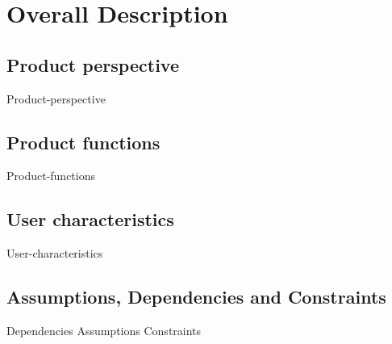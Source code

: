 \section{Overall Description}

\subsection{Product	perspective}
{Product-perspective}
	

\subsection{Product	functions}
{Product-functions}
	
	
\subsection{User characteristics}
{User-characteristics}
	
	
\subsection{Assumptions, Dependencies and Constraints}
{Dependencies}
{Assumptions}
{Constraints}